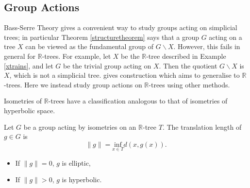 \subsection{Group Actions}
Bass-Serre Theory gives a convenient way to study groups acting on simplicial trees; in particular Theorem \ref{structuretheorem} says that a group $G$ acting on a tree $X$ can be viewed as the fundamental group of $G\backslash X$. However, this fails in general for $\mathbb{R}$-trees. For example, let $X$ be the $\mathbb{R}$-tree described in Example \ref{xtrains}, and let $G$ be the trivial group acting on $X$. Then the quotient $G\backslash X$ is $X$, which is not a simplicial tree. \cite{Levit_rtrees} gives construction which aims to generalise to $\mathbb{R}$-trees. Here we instead study group actions on $\mathbb{R}$-trees using other methods.

Isometries of $\mathbb{R}$-trees have a classification analogous to that of isometries of hyperbolic space. 
\begin{definition}
    Let $G$ be a group acting by isometries on an $\mathbb{R}$-tree $T$. The \textnormal{translation length} of $g\in G$ is \[\lVert g\rVert=\underset{x\in T}{\text{inf}}d(x,g(x)).\]
    \begin{itemize}
        \item If $\lVert g\rVert=0$, $g$ is \textnormal{elliptic},
        \item If $\lVert g\rVert>0$, $g$ is \textnormal{hyperbolic}.
    \end{itemize}
\end{definition}

